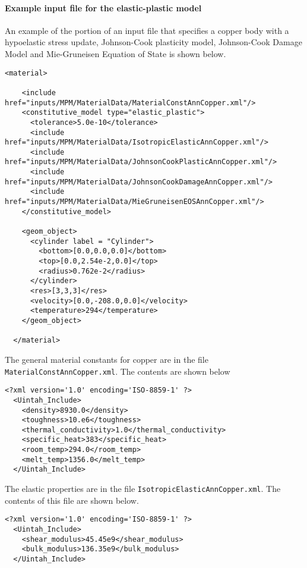   \paragraph{Example input file for the elastic-plastic model}
  An example of the portion of an input file that specifies a copper body
  with a hypoelastic stress update, Johnson-Cook plasticity model,
  Johnson-Cook Damage Model and Mie-Gruneisen Equation of State is shown
  below.
  \begin{Verbatim}[fontsize=\footnotesize]
  <material>

    <include href="inputs/MPM/MaterialData/MaterialConstAnnCopper.xml"/>
    <constitutive_model type="elastic_plastic">
      <tolerance>5.0e-10</tolerance>
      <include href="inputs/MPM/MaterialData/IsotropicElasticAnnCopper.xml"/>
      <include href="inputs/MPM/MaterialData/JohnsonCookPlasticAnnCopper.xml"/>
      <include href="inputs/MPM/MaterialData/JohnsonCookDamageAnnCopper.xml"/>
      <include href="inputs/MPM/MaterialData/MieGruneisenEOSAnnCopper.xml"/>
    </constitutive_model>

    <geom_object>
      <cylinder label = "Cylinder">
        <bottom>[0.0,0.0,0.0]</bottom>
        <top>[0.0,2.54e-2,0.0]</top>
        <radius>0.762e-2</radius>
      </cylinder>
      <res>[3,3,3]</res>
      <velocity>[0.0,-208.0,0.0]</velocity>
      <temperature>294</temperature>
    </geom_object>

  </material>
  \end{Verbatim}

  The general material constants for copper are in the file
  \verb+MaterialConstAnnCopper.xml+.  The contents are shown below
  \begin{Verbatim}[fontsize=\footnotesize]
  <?xml version='1.0' encoding='ISO-8859-1' ?>
  <Uintah_Include>
    <density>8930.0</density>
    <toughness>10.e6</toughness>
    <thermal_conductivity>1.0</thermal_conductivity>
    <specific_heat>383</specific_heat>
    <room_temp>294.0</room_temp>
    <melt_temp>1356.0</melt_temp>
  </Uintah_Include>
  \end{Verbatim}

  The elastic properties are in the file \verb+IsotropicElasticAnnCopper.xml+.
  The contents of this file are shown below.
  \begin{Verbatim}[fontsize=\footnotesize]
  <?xml version='1.0' encoding='ISO-8859-1' ?>
  <Uintah_Include>
    <shear_modulus>45.45e9</shear_modulus>
    <bulk_modulus>136.35e9</bulk_modulus>
  </Uintah_Include>
  \end{Verbatim}

